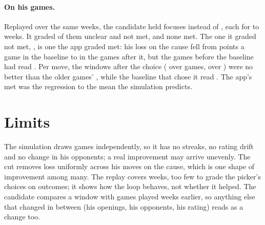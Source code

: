 \documentclass[11pt]{article}
\begin{document}
\paragraph{On his games.} Replayed over the same \Weeks{} weeks, the candidate held \CandFocuses{}
focuses instead of \Focuses, each for \CandSpanMin{} to \CandSpanMax{} weeks. It graded
\CandUnclear{} of them unclear and \CandNotMet{} not met, and none met. The one it graded not met,
\texttt{\FlipCause}, is one the app graded met: his loss on the cause fell from \FlipGameBaseline{}
points a game in the baseline to \FlipGameAppWindow{} in the \Window{} games after it, but the
\Baseline{} games before the baseline had read \FlipGameReference. Per move, the windows after the
choice (\FlipAppWindow{} over \Window{} games, \FlipWindow{} over \CandWindow) were no better than
the older games' \FlipReference, while the baseline that chose it read \FlipBaseline. The app's met
was the regression to the mean the simulation predicts.

\section{Limits}

The simulation draws games independently, so it has no streaks, no rating drift and no change in
his opponents; a real improvement may arrive unevenly. The cut removes loss uniformly across his
moves on the cause, which is one shape of improvement among many. The replay covers \Weeks{}
weeks, too few to grade the picker's choices on outcomes; it shows how the loop behaves, not
whether it helped. The candidate compares a window with games played weeks earlier, so anything
else that changed in between (his openings, his opponents, his rating) reads as a change too.
\end{document}
